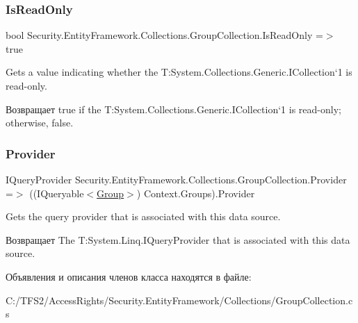 \subsubsection{\texorpdfstring{Is\+Read\+Only}{IsReadOnly}}
{\footnotesize\ttfamily bool Security.\+Entity\+Framework.\+Collections.\+Group\+Collection.\+Is\+Read\+Only =$>$ true}



Gets a value indicating whether the T\+:\+System.\+Collections.\+Generic.\+I\+Collection`1 is read-\/only. 

\begin{DoxyReturn}{Возвращает}
true if the T\+:\+System.\+Collections.\+Generic.\+I\+Collection`1 is read-\/only; otherwise, false. 
\end{DoxyReturn}
\mbox{\label{class_security_1_1_entity_framework_1_1_collections_1_1_group_collection_a646874bfcb709c7017284f1e97a69088}} 
\subsubsection{\texorpdfstring{Provider}{Provider}}
{\footnotesize\ttfamily I\+Query\+Provider Security.\+Entity\+Framework.\+Collections.\+Group\+Collection.\+Provider =$>$ ((I\+Queryable$<$\hyperlink{class_security_1_1_model_1_1_group}{Group}$>$) Context.\+Groups).Provider}



Gets the query provider that is associated with this data source. 

\begin{DoxyReturn}{Возвращает}
The T\+:\+System.\+Linq.\+I\+Query\+Provider that is associated with this data source. 
\end{DoxyReturn}


Объявления и описания членов класса находятся в файле\+:\begin{DoxyCompactItemize}
\item 
C\+:/\+T\+F\+S2/\+Access\+Rights/\+Security.\+Entity\+Framework/\+Collections/Group\+Collection.\+cs\end{DoxyCompactItemize}
